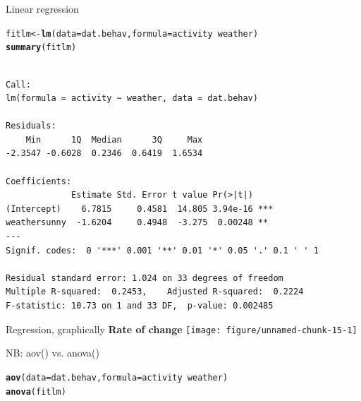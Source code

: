 \documentclass[10pt]{beamer}\usepackage[]{graphicx}\usepackage[]{color}
\makeatletter
\newcommand{\hlopt}[1]{\textcolor[rgb]{0,0,0}{#1}}%
\newcommand{\hlstd}[1]{\textcolor[rgb]{0.345,0.345,0.345}{#1}}%
\newcommand{\hlkwb}[1]{\textcolor[rgb]{0.69,0.353,0.396}{#1}}%
\newcommand{\hlkwc}[1]{\textcolor[rgb]{0.333,0.667,0.333}{#1}}%
\newcommand{\hlkwd}[1]{\textcolor[rgb]{0.737,0.353,0.396}{\textbf{#1}}}%
\newenvironment{kframe}{%
 \def\at@end@of@kframe{}%
 \ifinner\ifhmode%
  \def\at@end@of@kframe{\end{minipage}}%
  \begin{minipage}{\columnwidth}%
 \fi\fi%
 \def\FrameCommand##1{\hskip\@totalleftmargin \hskip-\fboxsep
 \colorbox{shadecolor}{##1}\hskip-\fboxsep
     \hskip-\linewidth \hskip-\@totalleftmargin \hskip\columnwidth}%
 \MakeFramed {\advance\hsize-\width
   \@totalleftmargin\z@ \linewidth\hsize
   \@setminipage}}%
 {\par\unskip\endMakeFramed%
 \at@end@of@kframe}
\newenvironment{knitrout}{}{} %
\makeatother
\begin{document}
\begin{frame}[fragile]{Linear regression}

\begin{knitrout}
\color{fgcolor}\begin{kframe}
\begin{alltt}
\hlstd{fitlm} \hlkwb{<-} \hlkwd{lm}\hlstd{(}\hlkwc{data} \hlstd{= dat.behav,} \hlkwc{formula} \hlstd{= activity} \hlopt{~} \hlstd{weather)}
\hlkwd{summary}\hlstd{(fitlm)}
\end{alltt}
\begin{verbatim}

Call:
lm(formula = activity ~ weather, data = dat.behav)

Residuals:
    Min      1Q  Median      3Q     Max 
-2.3547 -0.6028  0.2346  0.6419  1.6534 

Coefficients:
             Estimate Std. Error t value Pr(>|t|)    
(Intercept)    6.7815     0.4581  14.805 3.94e-16 ***
weathersunny  -1.6204     0.4948  -3.275  0.00248 ** 
---
Signif. codes:  0 '***' 0.001 '**' 0.01 '*' 0.05 '.' 0.1 ' ' 1

Residual standard error: 1.024 on 33 degrees of freedom
Multiple R-squared:  0.2453,	Adjusted R-squared:  0.2224 
F-statistic: 10.73 on 1 and 33 DF,  p-value: 0.002485
\end{verbatim}
\end{kframe}
\end{knitrout}
\end{frame}

\begin{frame}[fragile]{Regression, graphically}
\textbf{Rate of change}
\centering
\begin{knitrout}
\color{fgcolor}
\texttt{[image: figure/unnamed-chunk-15-1]} 

\end{knitrout}
\end{frame}


\begin{frame}[fragile]{NB: aov() vs. anova()}

\begin{knitrout}
\color{fgcolor}\begin{kframe}
\begin{alltt}
\hlkwd{aov}\hlstd{(}\hlkwc{data} \hlstd{= dat.behav,} \hlkwc{formula} \hlstd{= activity} \hlopt{~} \hlstd{weather)}
\hlkwd{anova}\hlstd{(fitlm)}
\end{alltt}
\end{kframe}
\end{knitrout}

\end{frame}
\end{document}

